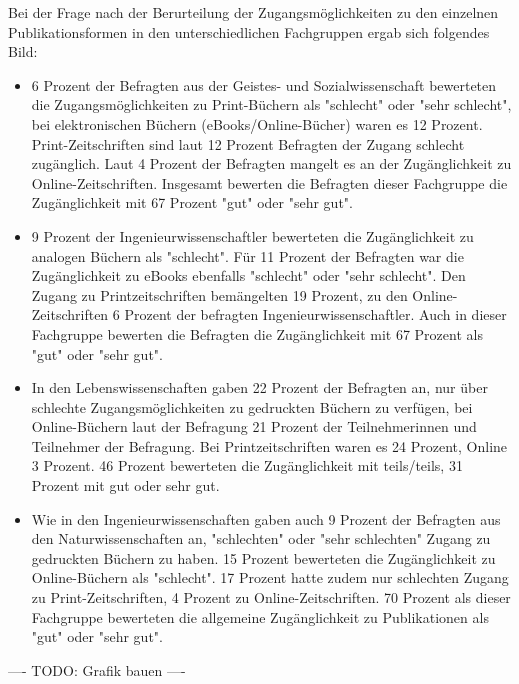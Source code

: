 Bei der Frage nach der Berurteilung der Zugangsmöglichkeiten zu den einzelnen Publikationsformen in den unterschiedlichen Fachgruppen ergab sich folgendes Bild:
\begin{itemize}
\item 6 Prozent der Befragten aus der Geistes- und Sozialwissenschaft bewerteten die Zugangsmöglichkeiten zu Print-Büchern als "schlecht" oder "sehr schlecht", bei elektronischen Büchern (eBooks/Online-Bücher) waren es 12 Prozent. Print-Zeitschriften sind laut 12 Prozent Befragten der Zugang schlecht zugänglich. Laut 4 Prozent der Befragten mangelt es an der Zugänglichkeit zu Online-Zeitschriften. Insgesamt bewerten die Befragten dieser Fachgruppe die Zugänglichkeit mit 67 Prozent "gut" oder "sehr gut".
\item 9 Prozent der Ingenieurwissenschaftler bewerteten die Zugänglichkeit zu analogen Büchern als "schlecht". Für 11 Prozent der Befragten war die Zugänglichkeit zu eBooks ebenfalls "schlecht" oder "sehr schlecht". Den Zugang zu Printzeitschriften bemängelten 19 Prozent, zu den Online-Zeitschriften 6 Prozent der befragten Ingenieurwissenschaftler. Auch in dieser Fachgruppe bewerten die Befragten die Zugänglichkeit mit 67 Prozent als "gut" oder "sehr gut".
\item In den Lebenswissenschaften gaben 22 Prozent der Befragten an, nur über schlechte Zugangsmöglichkeiten zu gedruckten Büchern zu verfügen, bei Online-Büchern laut der Befragung 21 Prozent der Teilnehmerinnen und Teilnehmer der Befragung. Bei Printzeitschriften waren es 24 Prozent, Online 3 Prozent. 46 Prozent bewerteten die Zugänglichkeit mit teils/teils, 31 Prozent mit gut oder sehr gut.
\item Wie in den Ingenieurwissenschaften gaben auch 9 Prozent der Befragten aus den Naturwissenschaften an, "schlechten" oder "sehr schlechten" Zugang zu gedruckten Büchern zu haben. 15 Prozent bewerteten die Zugänglichkeit zu Online-Büchern als "schlecht". 17 Prozent hatte zudem nur schlechten Zugang zu Print-Zeitschriften, 4 Prozent zu Online-Zeitschriften. 70 Prozent als dieser Fachgruppe bewerteten die allgemeine Zugänglichkeit zu Publikationen als "gut" oder "sehr gut".
\end{itemize}

---- TODO: Grafik bauen ----

